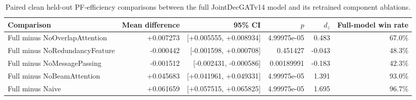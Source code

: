 \begin{table}[t]
\centering
\caption{Paired clean held-out PF-efficiency comparisons between the full JointDecGATv14 model and its retrained component ablations.}
\label{tab:clean_component_ablation_statistics}
\begin{tabular}{lrrrrr}
\toprule
Comparison & Mean difference & 95\% CI & $p$ & $d_z$ & Full-model win rate \\
\midrule
Full minus NoOverlapAttention & +0.007273 & [+0.005555, +0.008934] & 4.99975e-05 & 0.483 & 67.0\% \\
Full minus NoRedundancyFeature & -0.000442 & [-0.001598, +0.000708] & 0.451427 & -0.043 & 48.3\% \\
Full minus NoMessagePassing & -0.001512 & [-0.002431, -0.000586] & 0.00189991 & -0.183 & 42.3\% \\
Full minus NoBeamAttention & +0.045683 & [+0.041961, +0.049331] & 4.99975e-05 & 1.391 & 93.0\% \\
Full minus Naive & +0.061659 & [+0.057515, +0.065825] & 4.99975e-05 & 1.695 & 96.7\% \\
\bottomrule
\end{tabular}
\end{table}